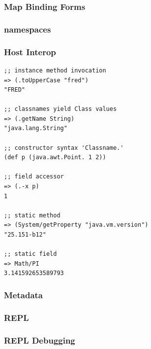 \documentclass{beamer}
\begin{document}
%
%


\begin{frame}
  \frametitle{Map Binding Forms}
\end{frame}


\begin{frame}
  \frametitle{namespaces}
\end{frame}

\begin{frame}[fragile]
  \frametitle{Host Interop}
  \begin{verbatim}
;; instance method invocation
=> (.toUpperCase "fred")
"FRED"

;; classnames yield Class values
=> (.getName String)
"java.lang.String"

;; constructor syntax 'Classname.'
(def p (java.awt.Point. 1 2))

;; field accessor
=> (.-x p)
1

;; static method
=> (System/getProperty "java.vm.version")
"25.151-b12"

;; static field
=> Math/PI
3.141592653589793
  \end{verbatim}
\end{frame}

\begin{frame}
  \frametitle{Metadata}

\end{frame}

\begin{frame}
  \frametitle{REPL}

\end{frame}

\begin{frame}
  \frametitle{REPL Debugging}
% 
%

\end{frame}
\end{document}
